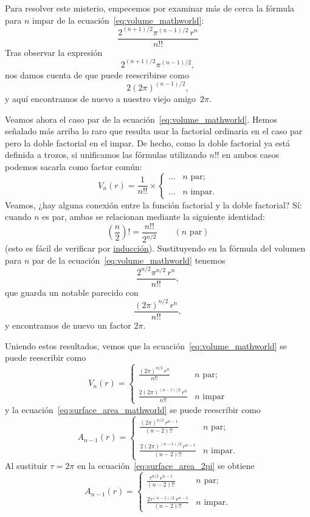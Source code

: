 Para resolver este misterio, empecemos por examinar más de cerca la fórmula para $n$ impar de la ecuación~\eqref{eq:volume_mathworld}:
\[ \frac{2^{(n+1)/2}\pi^{(n-1)/2}\,r^n}{n!!} \]
Tras observar la expresión
\[ 2^{(n+1)/2}\pi^{(n-1)/2}, \]
nos damos cuenta de que puede reescribirse como
\[ 2(2\pi)^{(n-1)/2}, \]
y aquí encontramos de nuevo a nuestro viejo amigo~$2\pi$.

Veamos ahora el caso par de la ecuación~\eqref{eq:volume_mathworld}. Hemos señalado más arriba lo raro que resulta usar la factorial ordinaria en el caso par pero la doble factorial en el impar. De hecho, como la doble factorial ya está definida a trozos, si unificamos las fórmulas utilizando $n!!$ en ambos casos podemos sacarla como factor común:
\[
V_n(r) = \frac{1}{n!!}\times \begin{cases}
\ldots & n \text{ par}; \\ \\
 \ldots & n \text{ impar}.
 \end{cases}
\]
Veamos, ¿hay alguna conexión entre la función factorial y la doble factorial? Sí: cuando $n$ es par, ambas se relacionan mediante la siguiente identidad:
\[ \left(\frac{n}{2}\right)! = \frac{n!!}{2^{n/2}} \qquad (\text{$n$ par}) \]
(esto es fácil de verificar por \href{https://es.wikipedia.org/wiki/Inducción_matemática}{inducción}). Sustituyendo en la fórmula del volumen para $n$ par de la ecuación~\eqref{eq:volume_mathworld} tenemos
\[ \frac{2^{n/2}\pi^{n/2}\,r^n}{n!!}, \]
que guarda un notable parecido con
\[ \frac{(2\pi)^{n/2}\,r^n}{n!!}, \]
y encontramos de nuevo un factor $2\pi$.

Uniendo estos resultados, vemos que la ecuación~\eqref{eq:volume_mathworld} se puede reescribir como
\begin{equation}
\label{eq:volume_2pi}
V_n(r) = \begin{cases}
 \displaystyle \frac{(2\pi)^{n/2}\,r^n}{n!!} & n \text{ par}; \\ \\
 \displaystyle \frac{2(2\pi)^{(n-1)/2}\,r^n}{n!!} & n \text{ impar}
 \end{cases}
\end{equation}
y la ecuación~\eqref{eq:surface_area_mathworld} se puede reescribir como
\begin{equation}
\label{eq:surface_area_2pi}
A_{n-1}(r) = \begin{cases}
\displaystyle \frac{(2\pi)^{n/2}\,r^{n-1}}{(n-2)!!} & n \text{ par}; \\ \\
\displaystyle \frac{2(2\pi)^{(n-1)/2}\,r^{n-1}}{(n-2)!!} & n \text{ impar}.
\end{cases}
\end{equation}
Al sustituir $\tau=2\pi$ en la ecuación~\eqref{eq:surface_area_2pi} se obtiene
\[
A_{n-1}(r) = \begin{cases}
\displaystyle \frac{\tau^{n/2}\,r^{n-1}}{(n-2)!!} & n \text{ par}; \\ \\
\displaystyle \frac{2\tau^{(n-1)/2}\,r^{n-1}}{(n-2)!!} & n \text{ impar}.
\end{cases} \]

